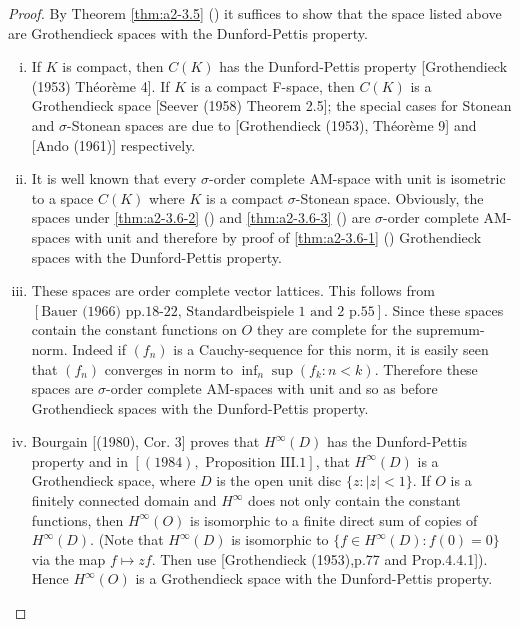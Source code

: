 \begin{proof}
By Theorem \ref{thm:a2-3.5} () it suffices to show that the space listed above are Grothendieck spaces with the Dunford-Pettis property.
\begin{enumerate}[(i)]
\item 
If $K$ is compact, then $C(K)$ has the Dunford-Pettis property [Grothendieck (1953) Théorème 4].
If $K$ is a compact F-space, then $C(K)$ is a Grothendieck space [Seever (1958) Theorem 2.5]; the special cases for Stonean and $\sigma$-Stonean spaces are due to [Grothendieck (1953), Théorème 9] and [Ando (1961)] respectively.
 
\item 
It is well known that every $\sigma$-order complete AM-space with unit is isometric to a space $C(K)$ where $K$ is a compact $\sigma$-Stonean space.
Obviously, the spaces under 
\ref{thm:a2-3.6-2} () and \ref{thm:a2-3.6-3} () are $\sigma$-order complete AM-spaces with unit and therefore by 
proof of \ref{thm:a2-3.6-1} () Grothendieck spaces with the Dunford-Pettis property.
 
\item
These spaces are order complete vector lattices.
This follows from $[\text{Bauer (1966) pp.18-22, Standardbeispiele 1 and 2 p.55}]$.
Since these spaces contain the constant functions on $O$ they are complete for the supremum-norm.
Indeed if $(f_n)$ is a Cauchy-sequence for this norm, it is easily seen that $(f_n)$ converges in norm to $\inf_n \sup(f_k \colon n < k)$.
Therefore these spaces are $\sigma$-order complete AM-spaces with unit and so as before Grothendieck spaces with the Dunford-Pettis property.
\item 
Bourgain [(1980), Cor. 3] proves that $H^{\infty}(D)$ has the Dunford-Pettis property and in $[(1984), \text{ Proposition III.1}]$, that $H^{\infty}(D)$ is a
Grothendieck space, where $D$ is the open unit disc $\{z \colon |z| < 1\}$.
If $O$ is a finitely connected domain and $H^{\infty}$ does not only contain the constant functions, then $H^{\infty}(O)$ is isomorphic to a finite direct sum of copies of $H^{\infty}(D)$.
(Note that $H^{\infty}(D)$ is isomorphic to $\{f \in H^{\infty}(D) \colon f(0) = 0\}$ via the map $f \mapsto zf$.
Then use [Grothendieck (1953),p.77 and Prop.4.4.1]).
Hence $H^{\infty}(O)$ is a Grothendieck space with the Dunford-Pettis property.
\end{enumerate}
\end{proof}

